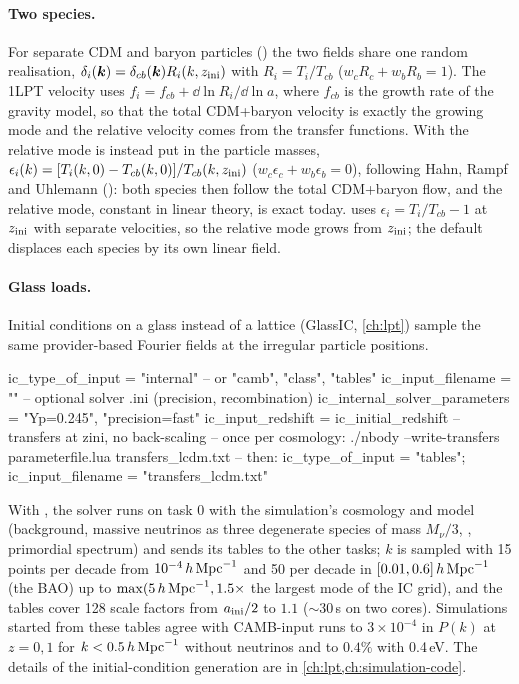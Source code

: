 \paragraph*{Two species.} For separate CDM and baryon particles () the two fields share one random
realisation, $\delta_i(\bm{k})=\delta_{cb}(\bm{k})R_i(k,z_{\rm ini})$ with $R_i=T_i/T_{cb}$ ($w_cR_c+w_bR_b=1$). The 1LPT
velocity uses $f_i=f_{cb}+\dd\ln R_i/\dd\ln a$, where $f_{cb}$ is the growth rate of the gravity model, so that the
total CDM+baryon velocity is exactly the growing mode and the relative velocity comes from the transfer functions.
With  the relative mode is instead put in the particle masses,
$\epsilon_i(k)=[T_i(k,0)-T_{cb}(k,0)]/T_{cb}(k,z_{\rm ini})$ ($w_c\epsilon_c+w_b\epsilon_b=0$), following Hahn, Rampf and
Uhlemann (): both species then follow the total CDM+baryon flow, and the relative mode, constant
in linear theory, is exact today.  uses $\epsilon_i=T_i/T_{cb}-1$ at $z_{\rm ini}$ with separate
velocities, so the relative mode grows from $z_{\rm ini}$; the default  displaces each species
by its own linear field.

\paragraph*{Glass loads.} Initial conditions on a glass instead of a lattice (GlassIC, \cref{ch:lpt}) sample the
same provider-based Fourier fields at the irregular particle positions.

\begin{paramfile}
ic_type_of_input  = "internal"            -- or "camb", "class", "tables"
ic_input_filename = ""                    -- optional solver .ini (precision, recombination)
ic_internal_solver_parameters = {"Yp=0.245", "precision=fast"}
ic_input_redshift = ic_initial_redshift   -- transfers at zini, no back-scaling
-- once per cosmology:  ./nbody --write-transfers parameterfile.lua transfers_lcdm.txt
-- then:                ic_type_of_input = "tables"; ic_input_filename = "transfers_lcdm.txt"
\end{paramfile}
With , the solver runs on task 0 with the simulation's cosmology and model (background, massive
neutrinos as three degenerate species of mass $M_\nu/3$, , primordial spectrum) and sends its
tables to the other tasks; $k$ is sampled with 15 points per decade from $10^{-4}\,h\,\mathrm{Mpc}^{-1}$ and 50 per decade in
$[0.01,0.6]\,h\,\mathrm{Mpc}^{-1}$ (the BAO) up to $\max(5\,h\,\mathrm{Mpc}^{-1},1.5\times$ the largest mode of the IC grid), and the tables cover 128
scale factors from $a_{\rm ini}/2$ to $1.1$ ($\sim30$\,s on two cores). Simulations started from these tables agree
with CAMB-input runs to $3\times10^{-4}$ in $P(k)$ at $z=0,1$ for $k<0.5\,h\,\mathrm{Mpc}^{-1}$ without neutrinos and to $0.4\%$ with
0.4\,eV. The details of the initial-condition generation are in \cref{ch:lpt,ch:simulation-code}.
